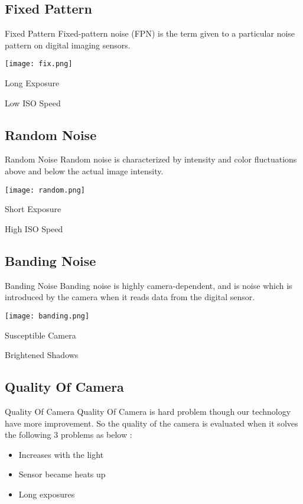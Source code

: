 \documentclass{beamer}
\begin{document}
\subsection{Fixed Pattern}
\begin{frame}{Fixed Pattern}
Fixed-pattern noise (FPN) is the term given to a particular noise pattern on digital imaging sensors. 
\vspace{1cm}
\begin{center}
	\texttt{[image: fix.png]}

Long Exposure

Low ISO Speed
\end{center}

\end{frame}

\subsection{Random Noise}
\begin{frame}{Random Noise}
Random noise is characterized by intensity and color fluctuations above and below the actual image intensity.
\vspace{1cm}
\begin{center}
	\texttt{[image: random.png]}

Short Exposure

High ISO Speed
\end{center}
\end{frame}

\subsection{Banding Noise}
\begin{frame}{Banding Noise}
Banding noise is highly camera-dependent, and is noise which is introduced by the camera when it reads data from the digital sensor. 
\vspace{1cm}
\begin{center}
	\texttt{[image: banding.png]}

Susceptible Camera

Brightened Shadows
\end{center}
\end{frame}
\subsection{Quality Of Camera}
\begin{frame}{Quality Of Camera}
Quality Of Camera is hard problem though our technology have more improvement. So the quality of the camera is evaluated when it solves the following 3 problems as below :
\vspace{1cm}
\begin{center}
	\begin{itemize}
		\item Increases with the light
		\item Sensor became heats up
		\item Long exposures
	\end{itemize}
\end{center}

\end{frame}
\end{document}

